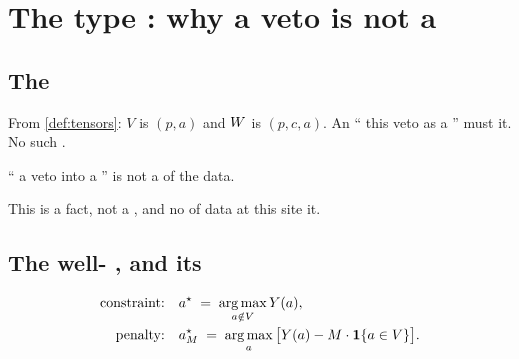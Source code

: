 \section{The type : why a veto is not a   }
\label{sec:type}

\subsection{The  }

From \cref{def:tensors}: $V$ is  $(p,a)$ and $W$ is  $(p,c,a)$.
An  `` this veto as a '' must  \emph{ }
 it. No such  .

\begin{proposition}
`` a veto into a  '' is not a  of the  data.
\end{proposition}

This is a  fact, not a  , and no  of data at
this site  it.

\subsection{The well- , and its }

\begin{definition}
\begin{align}
\text{constraint:}&\quad a^\star \;=\; \operatorname*{arg\,max}_{a \notin V} Y(a),\\
\text{penalty:}&\quad a^\star_M \;=\; \operatorname*{arg\,max}_{a} \big[Y(a) - M\cdot\mathbf{1}\{a\in V\}\big].
\end{align}
\end{definition}

